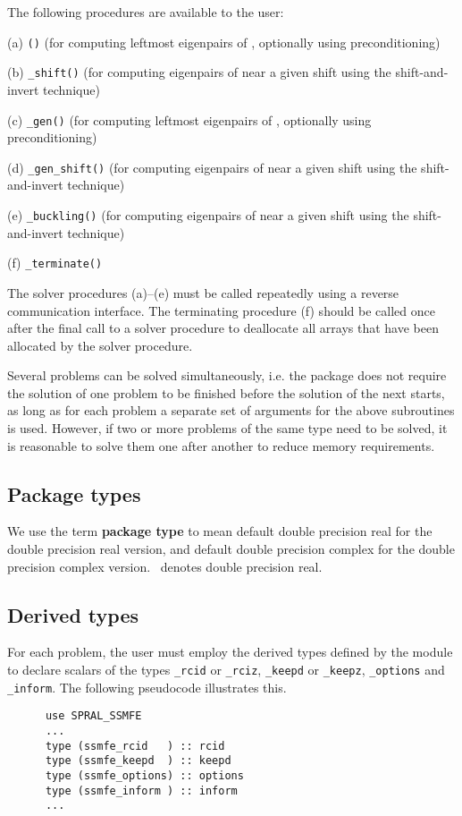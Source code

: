 \medskip

\noindent The following procedures are available to the user:
%
\begin{description}
\vspace{-0.1cm}
\item (a) {\tt \solver()} 
(for computing leftmost eigenpairs of , 
optionally using preconditioning)
\item (b) {\tt \solver\_shift()} 
(for computing eigenpairs of  near a given shift %
using the shift-and-invert technique)
\item (c) {\tt \solver\_gen()} 
(for computing leftmost eigenpairs of 
, optionally using preconditioning)
\item (d) {\tt \solver\_gen\_shift()} 
(for computing eigenpairs of 
 near a given shift %
using the shift-and-invert technique)
\item (e) {\tt \solver\_buckling()} 
(for computing eigenpairs of 
 near a given shift %
using the shift-and-invert technique)
\item (f) {\tt \solver\_terminate()} 
%
\end{description}

The solver procedures (a)--(e)
must be called repeatedly using
a reverse communication interface.
The terminating procedure (f)
should be called once after the
final call to 
a solver procedure
to deallocate all arrays 
that have been allocated by %
the solver procedure.

Several problems can be solved simultaneously,
i.e. the package does not require the solution of
one problem to be finished before the solution of
the next starts, as long as for each problem a separate set
of arguments for the above subroutines is used.
However, if two or more problems of the same type
need to be solved, it is reasonable to solve them one
after another  to reduce  memory requirements.

\subsection{Package types} 

We use the term {\bf package type} to mean
default double precision real for the double precision real version,
and default double precision complex
for the double precision complex version. 
\REALDP\
denotes double precision real.

\subsection{Derived types}
\label{derived types}
For each problem, the user must employ the derived types defined by the
module to declare scalars of the types 
{\tt \solver\_rcid} or 
{\tt \solver\_rciz}, 
{\tt \solver\_keepd} or
{\tt \solver\_keepz},
{\tt \solver\_options} and 
{\tt \solver\_inform}.
The following pseudocode illustrates this.
\begin{verbatim}
      use SPRAL_SSMFE    
      ...
      type (ssmfe_rcid   ) :: rcid
      type (ssmfe_keepd  ) :: keepd
      type (ssmfe_options) :: options
      type (ssmfe_inform ) :: inform
      ...
\end{verbatim}

